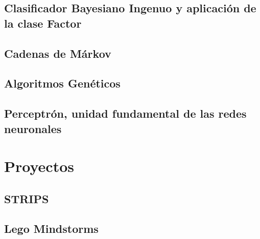\documentclass[12pt,openany]{book}
\begin{document}
\chapter[Bayes Ingenuo]{Clasificador Bayesiano Ingenuo y aplicación de la clase Factor}





\chapter{Cadenas de Márkov}





\chapter{Algoritmos Genéticos}





\chapter[Perceptrón]{Perceptrón, unidad fundamental de las redes neuronales}






\part{Proyectos}



\chapter{STRIPS}




\chapter{Lego Mindstorms}
\end{document}
